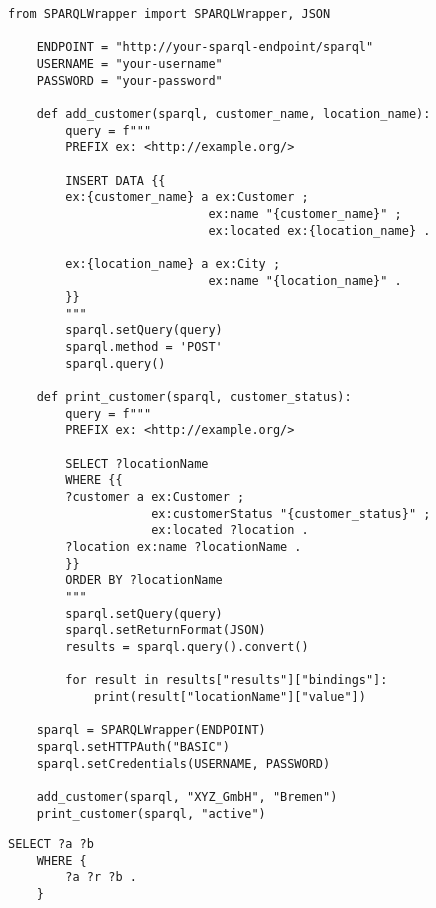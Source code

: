 \begin{lstlisting}[caption={Interact with SPARQL and Python}, label={lst:pythonSPARQL}]
	from SPARQLWrapper import SPARQLWrapper, JSON

	ENDPOINT = "http://your-sparql-endpoint/sparql"
	USERNAME = "your-username"
	PASSWORD = "your-password"

	def add_customer(sparql, customer_name, location_name):
		query = f"""
		PREFIX ex: <http://example.org/>

		INSERT DATA {{
		ex:{customer_name} a ex:Customer ;
							ex:name "{customer_name}" ;
							ex:located ex:{location_name} .
							
		ex:{location_name} a ex:City ;
							ex:name "{location_name}" .
		}}
		"""
		sparql.setQuery(query)
		sparql.method = 'POST'
		sparql.query()

	def print_customer(sparql, customer_status):
		query = f"""
		PREFIX ex: <http://example.org/>

		SELECT ?locationName
		WHERE {{
		?customer a ex:Customer ;
					ex:customerStatus "{customer_status}" ;
					ex:located ?location .
		?location ex:name ?locationName .
		}}
		ORDER BY ?locationName
		"""
		sparql.setQuery(query)
		sparql.setReturnFormat(JSON)
		results = sparql.query().convert()

		for result in results["results"]["bindings"]:
			print(result["locationName"]["value"])

	sparql = SPARQLWrapper(ENDPOINT)
	sparql.setHTTPAuth("BASIC")
	sparql.setCredentials(USERNAME, PASSWORD)

	add_customer(sparql, "XYZ_GmbH", "Bremen")
	print_customer(sparql, "active")
\end{lstlisting}

\begin{lstlisting}[caption={Graph Pattern Matching in SPARQL}, label={lst:GPMSPARQL}]
	SELECT ?a ?b
	WHERE {
  		?a ?r ?b .
	}
\end{lstlisting}

